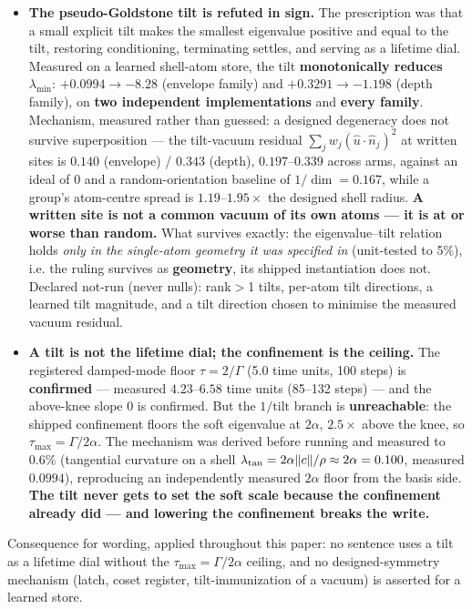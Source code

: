 \documentclass{article}
\begin{document}
\begin{itemize}
\item \textbf{The pseudo-Goldstone tilt is refuted in sign.} The prescription was that a small explicit tilt makes the smallest eigenvalue positive and equal to the tilt, restoring conditioning, terminating settles, and serving as a lifetime dial. Measured on a learned shell-atom store, the tilt \textbf{monotonically reduces} $\lambda_{\min}$: $+0.0994\to-8.28$ (envelope family) and $+0.3291\to-1.198$ (depth family), on \textbf{two independent implementations} and \textbf{every family}. Mechanism, measured rather than guessed: a designed degeneracy does not survive superposition --- the tilt-vacuum residual $\sum_j w_j(\hat u\cdot\hat n_j)^2$ at written sites is $0.140$ (envelope) / $0.343$ (depth), $0.197$--$0.339$ across arms, against an ideal of $0$ and a random-orientation baseline of $1/\dim=0.167$, while a group's atom-centre spread is $1.19$--$1.95\times$ the designed shell radius. \textbf{A written site is not a common vacuum of its own atoms --- it is at or worse than random.} What survives exactly: the eigenvalue--tilt relation holds \emph{only in the single-atom geometry it was specified in} (unit-tested to 5\%), i.e. the ruling survives as \textbf{geometry}, its shipped instantiation does not. Declared not-run (never nulls): rank$>$1 tilts, per-atom tilt directions, a learned tilt magnitude, and a tilt direction chosen to minimise the measured vacuum residual.
\item \textbf{A tilt is not the lifetime dial; the confinement is the ceiling.} The registered damped-mode floor $\tau=2/\Gamma$ (5.0 time units, 100 steps) is \textbf{confirmed} --- measured $4.23$--$6.58$ time units (85--132 steps) --- and the above-knee slope $0$ is confirmed. But the $1/\text{tilt}$ branch is \textbf{unreachable}: the shipped confinement floors the soft eigenvalue at $2\alpha$, $2.5\times$ above the knee, so $\tau_{\max}=\Gamma/2\alpha$. The mechanism was derived before running and measured to $0.6\%$ (tangential curvature on a shell $\lambda_{\rm tan}=2\alpha\|c\|/\rho\approx2\alpha=0.100$, measured $0.0994$), reproducing an independently measured $2\alpha$ floor from the basis side. \textbf{The tilt never gets to set the soft scale because the confinement already did --- and lowering the confinement breaks the write.}
\end{itemize}

Consequence for wording, applied throughout this paper: no sentence uses a tilt as a lifetime dial without the $\tau_{\max}=\Gamma/2\alpha$ ceiling, and no designed-symmetry mechanism (latch, coset register, tilt-immunization of a vacuum) is asserted for a learned store.
\end{document}
